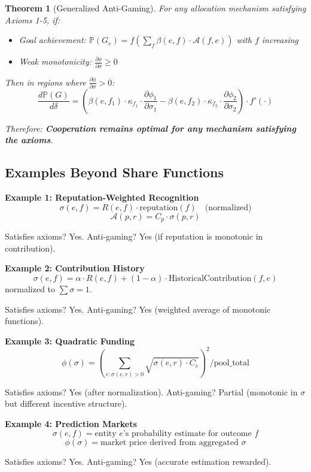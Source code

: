 \documentclass[11pt,a4paper]{article}
\newtheorem{theorem}{Theorem}[section]
\theoremstyle{definition}
\theoremstyle{remark}
\begin{document}
\begin{theorem}[Generalized Anti-Gaming]
For any allocation mechanism satisfying Axioms 1-5, if:
\begin{itemize}
\item Goal achievement: $\mathbb{P}(G_e) = f\left(\sum_f \beta(e,f) \cdot \mathcal{A}(f,e)\right)$ with $f$ increasing
\item Weak monotonicity: $\frac{\partial \phi}{\partial \sigma} \ge 0$
\end{itemize}

Then in regions where $\frac{\partial \phi}{\partial \sigma} > 0$:
\[ \frac{d\mathbb{P}(G)}{d\delta} = \left(\beta(e,f_1) \cdot \kappa_{f_1} \cdot \frac{\partial \phi_1}{\partial \sigma_1} - \beta(e,f_2) \cdot \kappa_{f_2} \cdot \frac{\partial \phi_2}{\partial \sigma_2}\right) \cdot f'(\cdot) \]

Therefore: \textbf{Cooperation remains optimal for any mechanism satisfying the axioms}.
\end{theorem}

\subsection{Examples Beyond Share Functions}

\textbf{Example 1: Reputation-Weighted Recognition}
\[ \sigma(e,f) = R(e,f) \cdot \text{reputation}(f) \quad \text{(normalized)} \]
\[ \mathcal{A}(p,r) = C_p \cdot \sigma(p,r) \]

Satisfies axioms? Yes. Anti-gaming? Yes (if reputation is monotonic in contribution).

\textbf{Example 2: Contribution History}
\[ \sigma(e,f) = \alpha \cdot R(e,f) + (1-\alpha) \cdot \text{HistoricalContribution}(f,e) \]
normalized to $\sum \sigma = 1$.

Satisfies axioms? Yes. Anti-gaming? Yes (weighted average of monotonic functions).

\textbf{Example 3: Quadratic Funding}
\[ \phi(\sigma) = \left(\sum_{e: \sigma(e,r)>0} \sqrt{\sigma(e,r) \cdot C_e}\right)^2 / \text{pool\_total} \]

Satisfies axioms? Yes (after normalization). Anti-gaming? Partial (monotonic in $\sigma$ but different incentive structure).

\textbf{Example 4: Prediction Markets}
\[ \sigma(e,f) = \text{entity } e \text{'s probability estimate for outcome } f \]
\[ \phi(\sigma) = \text{market price derived from aggregated } \sigma \]

Satisfies axioms? Yes. Anti-gaming? Yes (accurate estimation rewarded).
\end{document}
